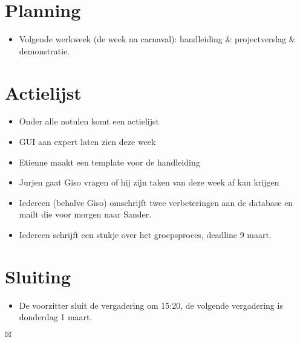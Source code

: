 \documentclass[]{article}
\begin{document}
\section{Planning}

\begin{itemize}
   \item Volgende werkweek (de week na carnaval): handleiding \& projectverslag \& demonstratie.
\end{itemize}

\section{Actielijst}

\begin{itemize}
    \item Onder alle notulen komt een actielijst
    \item GUI aan expert laten zien deze week
    \item Etienne maakt een template voor de handleiding
    \item Jurjen gaat Giso vragen of hij zijn taken van deze week af kan krijgen
    \item Iedereen (behalve Giso) omschrijft twee verbeteringen aan de database en mailt die voor morgen naar Sander.
    \item Iedereen schrijft een stukje over het groepsproces, deadline 9 maart.
\end{itemize}

\section{Sluiting}
  \begin{itemize}
    \item De voorzitter sluit de vergadering om 15:20, de volgende vergadering is donderdag 1 maart.
  \end{itemize}

$\boxtimes$
\end{document}
